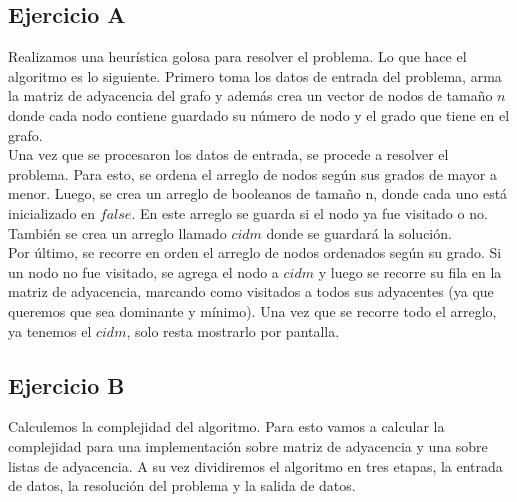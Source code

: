 
\subsection{Ejercicio A}
Realizamos una heurística golosa para resolver el problema. Lo que hace el algoritmo es lo siguiente. Primero toma los datos de entrada del problema, arma la matriz de adyacencia del grafo y además crea un vector de nodos de tamaño $n$ donde cada nodo contiene guardado su número de nodo y el grado que tiene en el grafo. \\ 
Una vez que se procesaron los datos de entrada, se procede a resolver el problema. Para esto, se ordena el arreglo de nodos según sus grados de mayor a menor. Luego, se crea un arreglo de booleanos de tamaño n, donde cada uno está inicializado en $false$. En este arreglo se guarda si el nodo ya fue visitado o no. También se crea un arreglo llamado $cidm$ donde se guardará la solución. \\ 
Por último, se recorre en orden el arreglo de nodos ordenados según su grado. Si un nodo no fue visitado, se agrega el nodo a $cidm$ y luego se recorre su fila en la matriz de adyacencia, marcando como visitados a todos sus adyacentes (ya que queremos que sea dominante y mínimo).
Una vez que se recorre todo el arreglo, ya tenemos el $cidm$, solo resta mostrarlo por pantalla.


\subsection{Ejercicio B}
Calculemos la complejidad del algoritmo. Para esto vamos a calcular la complejidad para una implementación sobre matriz de adyacencia y una sobre listas de adyacencia. A su vez dividiremos el algoritmo en tres etapas, la entrada de datos, la resolución del problema y la salida de datos. \\ 


